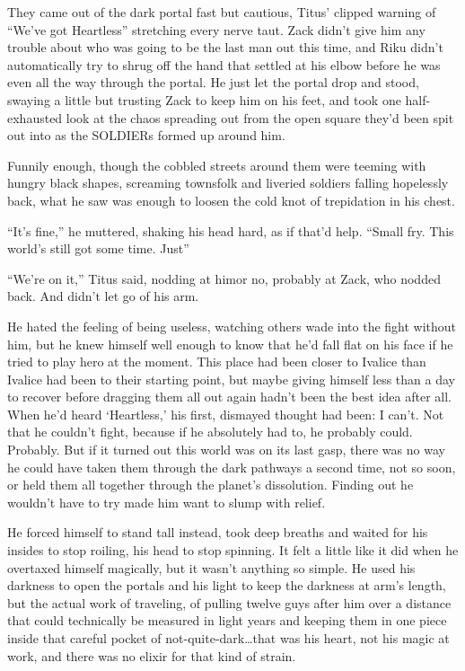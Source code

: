 
They came out of the dark portal fast but cautious, Titus' clipped warning of ``We've got Heartless'' stretching every nerve taut. Zack didn't give him any trouble about who was going to be the last man out this time, and Riku didn't automatically try to shrug off the hand that settled at his elbow before he was even all the way through the portal. He just let the portal drop and stood, swaying a little but trusting Zack to keep him on his feet, and took one half-exhausted look at the chaos spreading out from the open square they'd been spit out into as the SOLDIERs formed up around him.

Funnily enough, though the cobbled streets around them were teeming with hungry black shapes, screaming townsfolk and liveried soldiers falling hopelessly back, what he saw was enough to loosen the cold knot of trepidation in his chest.

``It's fine,'' he muttered, shaking his head hard, as if that'd help. ``Small fry. This world's still got some time. Just\textemdash ''

``We're on it,'' Titus said, nodding at him\textemdash or no, probably at Zack, who nodded back. And didn't let go of his arm.

He hated the feeling of being useless, watching others wade into the fight without him, but he knew himself well enough to know that he'd fall flat on his face if he tried to play hero at the moment. This place had been closer to Ivalice than Ivalice had been to their starting point, but maybe giving himself less than a day to recover before dragging them all out again hadn't been the best idea after all. When he'd heard `Heartless,' his first, dismayed thought had been: I can't. Not that he couldn't fight, because if he absolutely had to, he probably could. Probably. But if it turned out this world was on its last gasp, there was no way he could have taken them through the dark pathways a second time, not so soon, or held them all together through the planet's dissolution. Finding out he wouldn't have to try made him want to slump with relief.

He forced himself to stand tall instead, took deep breaths and waited for his insides to stop roiling, his head to stop spinning. It felt a little like it did when he overtaxed himself magically, but it wasn't anything so simple. He used his darkness to open the portals and his light to keep the darkness at arm's length, but the actual work of traveling, of pulling twelve guys after him over a distance that could technically be measured in light years and keeping them in one piece inside that careful pocket of not-quite-dark\ldots that was his heart, not his magic at work, and there was no elixir for that kind of strain.

